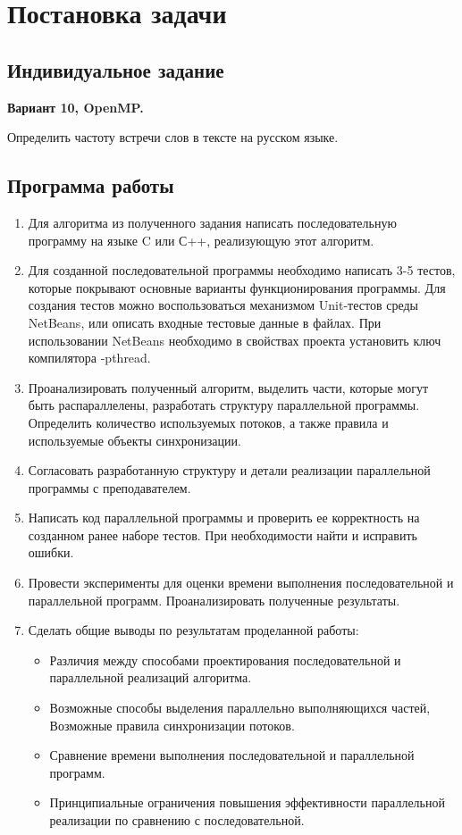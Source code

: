 \section{Постановка задачи}

\subsection{Индивидуальное задание}

\textbf{Вариант 10, OpenMP.}

Определить частоту встречи слов в тексте на русском языке.

\subsection{Программа работы}

\begin{enumerate}
\item Для алгоритма из полученного задания написать последовательную программу на языке C или С++, реализующую этот алгоритм.
\item Для созданной последовательной программы необходимо написать 3-5 тестов, которые покрывают основные варианты функционирования программы. Для создания тестов можно воспользоваться механизмом Unit-тестов среды NetBeans, или описать входные тестовые данные в файлах. При использовании NetBeans необходимо в свойствах проекта установить ключ компилятора -pthread.
\item Проанализировать полученный алгоритм, выделить части, которые могут быть распараллелены, разработать структуру параллельной программы. Определить количество используемых потоков, а также правила и используемые объекты синхронизации.
\item Согласовать разработанную структуру и детали реализации параллельной программы с преподавателем.
\item Написать код параллельной программы и проверить ее корректность на созданном ранее наборе тестов. При необходимости найти и исправить ошибки.
\item Провести эксперименты для оценки времени выполнения последовательной и параллельной программ. Проанализировать полученные результаты.
\item Сделать общие выводы по результатам проделанной работы: 
\begin{itemize}
\item Различия между способами проектирования последовательной и параллельной реализаций алгоритма.
\item Возможные способы выделения параллельно выполняющихся частей, Возможные правила синхронизации потоков.
\item Сравнение времени выполнения последовательной и параллельной программ.
\item Принципиальные ограничения повышения эффективности параллельной реализации по сравнению с последовательной.
\end{itemize}
\end{enumerate}

